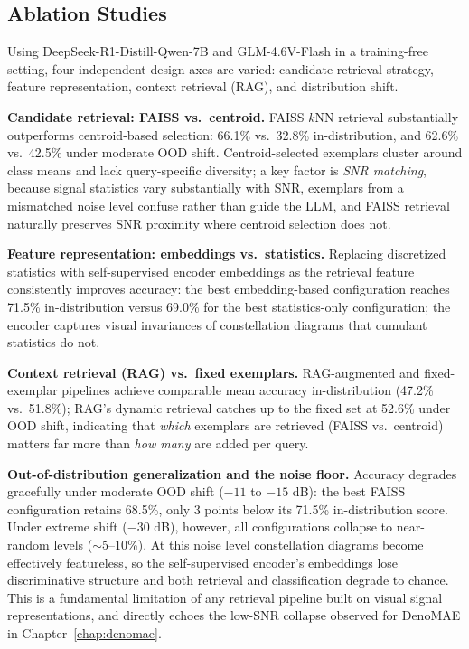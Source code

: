 \subsection{Ablation Studies}
\label{sec:disc_ablations}

Using DeepSeek-R1-Distill-Qwen-7B and GLM-4.6V-Flash in a training-free setting, four independent design axes are varied: candidate-retrieval strategy, feature representation, context retrieval (RAG), and distribution shift.

\textbf{Candidate retrieval: FAISS vs.\ centroid.} FAISS $k$NN retrieval substantially outperforms centroid-based selection: 66.1\% vs.\ 32.8\% in-distribution, and 62.6\% vs.\ 42.5\% under moderate OOD shift. Centroid-selected exemplars cluster around class means and lack query-specific diversity; a key factor is \emph{SNR matching}, because signal statistics vary substantially with SNR, exemplars from a mismatched noise level confuse rather than guide the LLM, and FAISS retrieval naturally preserves SNR proximity where centroid selection does not.

\textbf{Feature representation: embeddings vs.\ statistics.} Replacing discretized statistics with self-supervised encoder embeddings as the retrieval feature consistently improves accuracy: the best embedding-based configuration reaches 71.5\% in-distribution versus 69.0\% for the best statistics-only configuration; the encoder captures visual invariances of constellation diagrams that cumulant statistics do not.

\textbf{Context retrieval (RAG) vs.\ fixed exemplars.} RAG-augmented and fixed-exemplar pipelines achieve comparable mean accuracy in-distribution (47.2\% vs.\ 51.8\%); RAG's dynamic retrieval catches up to the fixed set at 52.6\% under OOD shift, indicating that \emph{which} exemplars are retrieved (FAISS vs.\ centroid) matters far more than \emph{how many} are added per query.

\textbf{Out-of-distribution generalization and the noise floor.} Accuracy degrades gracefully under moderate OOD shift ($-11$ to $-15$ dB): the best FAISS configuration retains 68.5\%, only 3 points below its 71.5\% in-distribution score. Under extreme shift ($-30$ dB), however, all configurations collapse to near-random levels ($\sim$5--10\%). At this noise level constellation diagrams become effectively featureless, so the self-supervised encoder's embeddings lose discriminative structure and both retrieval and classification degrade to chance. This is a fundamental limitation of any retrieval pipeline built on visual signal representations, and directly echoes the low-SNR collapse observed for DenoMAE in Chapter~\ref{chap:denomae}.

